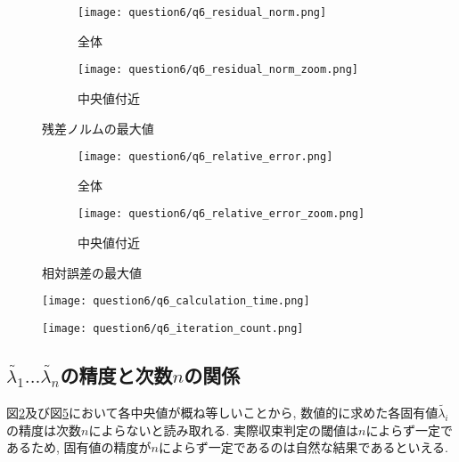 \documentclass[uplatex,a4j]{jsarticle}
\begin{document}
\begin{figure}[htbp]
  \centering

  \begin{subfigure}{0.45\textwidth}
    \centering
    \texttt{[image: question6/q6\_residual\_norm.png]}
    \caption{全体}
    \label{fig:q6_rn_whole}
  \end{subfigure}
  \hfill
  \begin{subfigure}{0.45\textwidth}
    \centering
    \texttt{[image: question6/q6\_residual\_norm\_zoom.png]}
    \caption{中央値付近}
    \label{fig:q6_rn_zoom}
  \end{subfigure}
  
  \caption{残差ノルムの最大値}
  \label{fig:q6_rn}
\end{figure}


\begin{figure}[htbp]
  \centering

  \begin{subfigure}{0.45\textwidth}
    \centering
    \texttt{[image: question6/q6\_relative\_error.png]}
    \caption{全体}
    \label{fig:q6_re_whole}
  \end{subfigure}
  \hfill
  \begin{subfigure}{0.45\textwidth}
    \centering
    \texttt{[image: question6/q6\_relative\_error\_zoom.png]}
    \caption{中央値付近}
    \label{fig:q6_re_zoom}
  \end{subfigure}
  
  \caption{相対誤差の最大値}
  \label{fig:q6_re}
\end{figure}


\begin{figure}[htbp]
  \centering

  \begin{minipage}[t]{0.48\textwidth}
    \centering
    \texttt{[image: question6/q6\_calculation\_time.png]}
    \label{fig:q6_ct}
  \end{minipage}
  \hfill
  \begin{minipage}[t]{0.48\textwidth}
    \centering
    \texttt{[image: question6/q6\_iteration\_count.png]}
    \label{fig:q6_ic}
  \end{minipage}
  
\end{figure}


\newpage
\subsection{$\tilde{\lambda_1} ... \tilde{\lambda_n}$の精度と次数$n$の関係}
\label{sec:q6_2}
図\ref{fig:q6_rn_zoom}及び図\ref{fig:q6_re_zoom}において各中央値が概ね等しいことから, 
数値的に求めた各固有値$\tilde{\lambda_i}$の精度は次数$n$によらないと読み取れる.
実際収束判定の閾値は$n$によらず一定であるため, 
固有値の精度が$n$によらず一定であるのは自然な結果であるといえる. 
\end{document}
